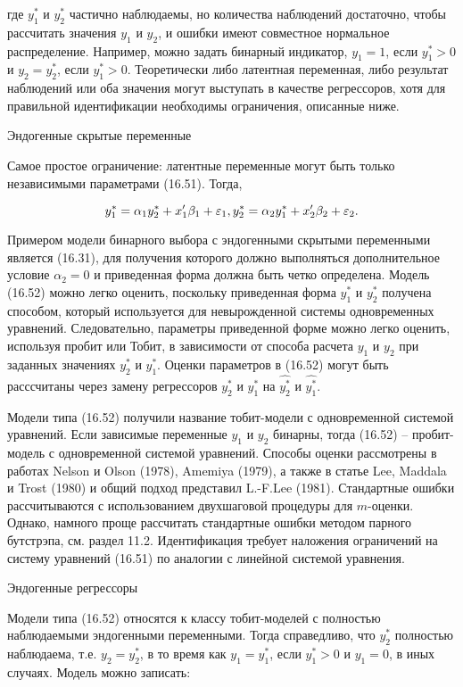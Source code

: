где $y_1^{*}$ и $y_2^{*}$ частично наблюдаемы, но количества наблюдений достаточно, чтобы рассчитать значения $y_1$ и $y_2$, и ошибки имеют совместное нормальное распределение. Например, можно задать бинарный индикатор, $y_1=1$, если $y_1^{*}>0$ и $y_2=y_2^{*}$, если $y_1^{*}>0$. Теоретически либо латентная переменная, либо результат наблюдений или оба значения могут выступать в качестве регрессоров, хотя для правильной идентификации необходимы ограничения, описанные ниже.

Эндогенные скрытые переменные


Самое простое ограничение: латентные переменные могут быть только независимыми параметрами (16.51). Тогда,

\begin{equation}
y_1^{*}=\alpha_{1}y_2^{*}+x_1'\beta_1+\varepsilon_1,\\
y_2^{*}=\alpha_{2}y_1^{*}+x_2'\beta_2+\varepsilon_2.
\end{equation}

Примером модели бинарного выбора с эндогенными скрытыми переменными является (16.31), для получения которого должно выполняться дополнительное условие $\alpha_2=0$ и приведенная форма должна быть четко определена. Модель (16.52) можно легко оценить, поскольку приведенная форма $y_1^{*}$ и $y_2^{*}$ получена способом, который используется для невырожденной системы одновременных уравнений. Следовательно, параметры приведенной форме можно легко оценить, используя пробит или Тобит, в зависимости от способа расчета $y_1$ и $y_2$ при заданных значениях $y_2^{*}$ и $y_1^{*}$. Оценки параметров в (16.52) могут быть расссчитаны через замену регрессоров $y_2^{*}$ и $y_1^{*}$ на $\hat{y_2^{*}}$ и $\hat{y_1^{*}}$. 

Модели типа (16.52) получили название тобит-модели с одновременной системой уравнений. Если зависимые переменные $y_1$ и $y_2$ бинарны, тогда (16.52) -- пробит-модель с одновременной системой уравнений. Способы оценки рассмотрены в работах Nelson и Olson (1978), Amemiya (1979), а также в статье Lee, Maddala и Trost (1980) и общий подход представил L.-F.Lee (1981). Стандартные ошибки рассчитываются с использованием двухшаговой процедуры для $m$-оценки. Однако, намного проще рассчитать стандартные ошибки методом парного бутстрэпа, см. раздел 11.2. Идентификация требует наложения ограничений на систему уравнений (16.51) по аналогии с линейной системой уравнения.

Эндогенные регрессоры

Модели типа (16.52) относятся к классу тобит-моделей с полностью наблюдаемыми эндогенными переменными. Тогда справедливо, что $y_2^{*}$ полностью наблюдаема, т.е. $y_2=y_2^{*}$, в то время как $y_1=y_1^{*}$, если $y_1^{*}>0$ и $y_1=0$, в иных случаях. Модель можно записать:

